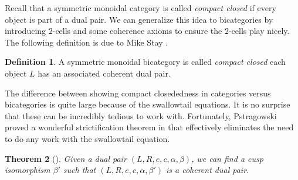 \documentclass[11pt]{amsart}
\newtheorem{thm}{Theorem}[section]
\theoremstyle{remark}
\theoremstyle{definition}
\newtheorem{defn}[thm]{Definition}
\begin{document}
Recall that a symmetric monoidal category is called \emph{compact closed} if every object is part of a dual pair. We can generalize this idea to bicategories by introducing $2$-cells and some coherence axioms to ensure the $2$-cells play nicely. The following definition is due to Mike Stay \cite{Stay}.

\begin{defn}
	\label{def:CompClosdBicat}
	A symmetric monoidal bicategory is called \emph{compact closed} each object $L$ has an associated coherent dual pair. 
\end{defn}

The difference between showing compact closededness in categories versus bicategories is quite large because of the swallowtail equations.  It is no surprise that these can be incredibly tedious to work with.  Fortunately, Pstragowski proved a wonderful strictification theorem in \cite[p.~22]{Piotr} that effectively eliminates the need to do any work with the swallowtail equation.  

\begin{thm}[{\cite{Piotr}}]
	\label{thm:StrictingDualPairs}
	Given a dual pair $(L,R,e,c,\alpha,\beta)$, we can find a cusp isomorphism $\beta'$ such that $(L,R,e,c,\alpha,\beta')$ is a coherent dual pair.
\end{thm}


\end{document}
